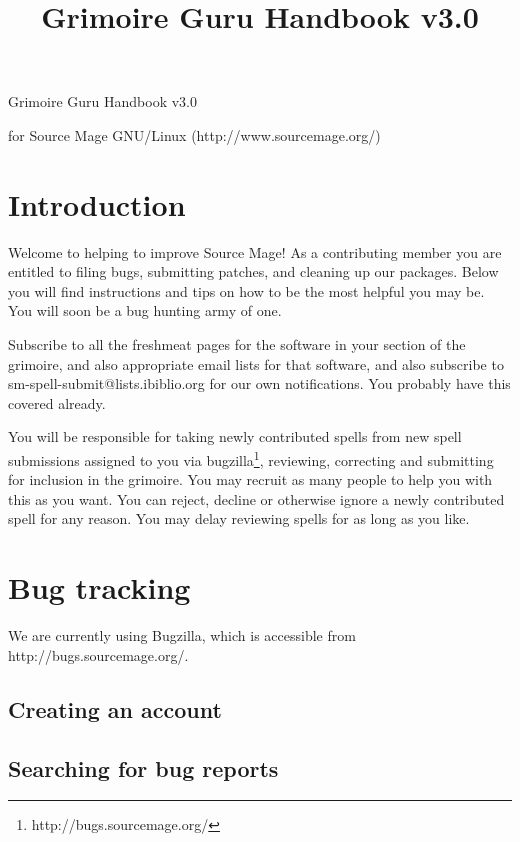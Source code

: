 \documentclass[a4paper,10pt]{book}
\begin{document}
\title{Grimoire Guru Handbook v3.0}
\begin{titlepage}

\begin{center}
\begin{Huge}
Grimoire Guru Handbook v3.0
\end{Huge}

\begin{LARGE}
for Source Mage GNU/Linux (http://www.sourcemage.org/)
\end{LARGE}

\end{center}
\end{titlepage}

\chapter{Introduction}
Welcome to helping to improve Source Mage! As a contributing member you are
entitled to filing bugs, submitting patches, and cleaning up our packages.
Below you will find instructions and tips on how to be the most helpful you
may be. You will soon be a bug hunting army of one.

Subscribe to all the freshmeat pages for the software in your section of
the grimoire, and also appropriate email lists for that software, and also
subscribe to sm-spell-submit@lists.ibiblio.org for our own notifications.
You probably have this covered already.

You will be responsible for taking newly contributed spells from new spell
submissions assigned to you via bugzilla\footnote
{http://bugs.sourcemage.org/}, reviewing, correcting and submitting for
inclusion in the grimoire. You may recruit as many people to help you with this
as you want. You can reject, decline or otherwise ignore a newly contributed
spell for any reason. You may delay reviewing spells for as long as you like.

\chapter{Bug tracking}
We are currently using Bugzilla, which is accessible from
http://bugs.sourcemage.org/.
\section{Creating an account}
\section{Searching for bug reports}
\end{document}

